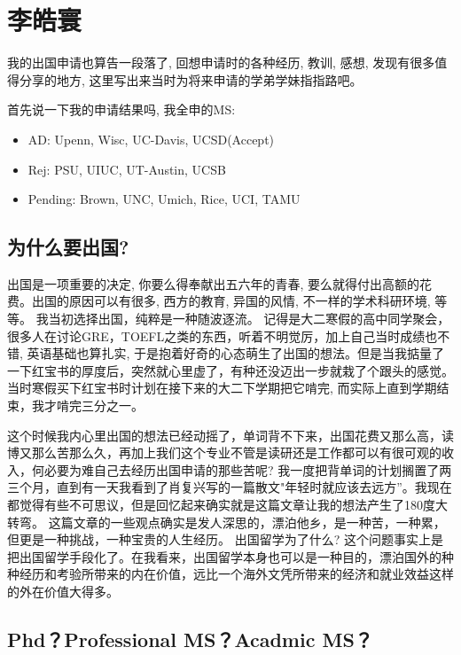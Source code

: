 \section{李皓寰}
我的出国申请也算告一段落了, 回想申请时的各种经历, 教训, 感想, 发现有很多值得分享的地方, 这里写出来当时为将来申请的学弟学妹指指路吧。\par

       首先说一下我的申请结果吗, 我全申的MS: 
\begin{itemize}
\item        AD: Upenn, Wisc, UC-Davis, UCSD(Accept)
\item        Rej: PSU, UIUC, UT-Austin, UCSB
\item       Pending: Brown, UNC, Umich, Rice, UCI, TAMU
\end{itemize}


\subsection{为什么要出国?}

出国是一项重要的决定, 你要么得奉献出五六年的青春, 要么就得付出高额的花费。出国的原因可以有很多, 西方的教育, 异国的风情, 不一样的学术科研环境, 等等。 我当初选择出国，纯粹是一种随波逐流。 记得是大二寒假的高中同学聚会， 很多人在讨论GRE，TOEFL之类的东西，听着不明觉厉，加上自己当时成绩也不错, 英语基础也算扎实, 于是抱着好奇的心态萌生了出国的想法。但是当我掂量了一下红宝书的厚度后，突然就心里虚了，有种还没迈出一步就栽了个跟头的感觉。当时寒假买下红宝书时计划在接下来的大二下学期把它啃完, 而实际上直到学期结束，我才啃完三分之一。\par

这个时候我内心里出国的想法已经动摇了，单词背不下来，出国花费又那么高，读博又那么苦那么久，再加上我们这个专业不管是读研还是工作都可以有很可观的收入，何必要为难自己去经历出国申请的那些苦呢? 我一度把背单词的计划搁置了两三个月，直到有一天我看到了肖复兴写的一篇散文"年轻时就应该去远方”。我现在都觉得有些不可思议，但是回忆起来确实就是这篇文章让我的想法产生了180度大转弯。 这篇文章的一些观点确实是发人深思的，漂泊他乡，是一种苦，一种累，但更是一种挑战，一种宝贵的人生经历。 出国留学为了什么? 这个问题事实上是把出国留学手段化了。在我看来，出国留学本身也可以是一种目的，漂泊国外的种种经历和考验所带来的内在价值，远比一个海外文凭所带来的经济和就业效益这样的外在价值大得多。

\subsection{Phd？Professional MS？Acadmic MS？}

